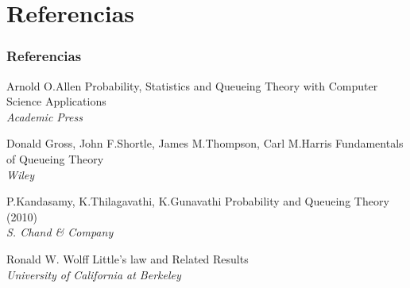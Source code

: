 \documentclass[8pt]{beamer}
\begin{document}
\section {Referencias}
\begin{frame}
\frametitle{Referencias}
\footnotesize{
  \begin{thebibliography}{99} %
     Arnold O.Allen
      \newblock Probability, Statistics and Queueing Theory with Computer Science Applications\\
      \newblock \emph{Academic Press}

     Donald Gross, John F.Shortle, James M.Thompson, Carl M.Harris
      \newblock Fundamentals of Queueing Theory\\
      \newblock \emph{Wiley}

     P.Kandasamy, K.Thilagavathi, K.Gunavathi
      \newblock Probability and Queueing Theory (2010)\\
      \newblock \emph{S. Chand \& Company}

     Ronald W. Wolff
      \newblock Little's law and Related Results\\
      \newblock \emph{University of California at Berkeley}

  \end{thebibliography}
}
\end{frame}
\end{document}
